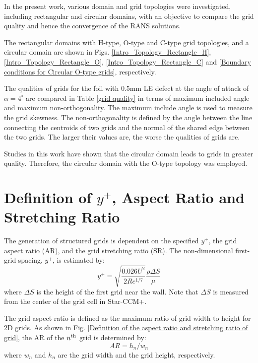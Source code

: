 \documentclass[onecolumn,11pt]{report}
\begin{document}
In the present work, various domain and grid topologies were investigated, including rectangular and circular domains, with an objective to compare the grid quality and hence the convergence of the RANS solutions. 

The rectangular domains with H-type, O-type and C-type grid topologies, and a circular domain are shown in Figs.  \ref{Intro_Topology_Rectangle_H}, \ref{Intro_Topology_Rectangle_O}, \ref{Intro_Topology_Rectangle_C} and \ref{Boundary conditions for Circular O-type grids}, respectively.



The qualities of grids for the foil with 0.5mm LE defect at the angle of attack of $\alpha=4^\circ$ are compared in Table  \ref{grid quality} in terms of maximum included angle and maximum non-orthogonality. The maximum include angle is used to measure the grid skewness. The non-orthogonality is defined by the angle between the line connecting the centroids of two grids and the normal of the shared edge between the two grids. The larger their values are, the worse the qualities of grids are.

Studies in this work have shown that the circular domain leads to grids in greater quality. Therefore, the circular domain with the O-type topology was employed. 


\section{Definition of $y^+$, Aspect Ratio and Stretching Ratio}

The generation of structured grids is dependent on the specified $y^+$, the grid aspect ratio (AR), and the grid stretching ratio (SR). The non-dimensional  first-grid spacing, $y^+$, is estimated by:
\begin{equation}
y^+ = \sqrt{\frac{0.026 U^2}{2Re^{1/7}}} \frac{\rho \Delta S}{ \mu}
\label{eq24}
\end{equation}
where $\Delta S$ is the height of the first grid near the wall. Note that  $\Delta S$ is measured from the center of the grid cell in Star-CCM+.

The grid aspect ratio is defined as the maximum ratio of grid width to height for 2D grids. As shown in Fig.  \ref{Definition of the aspect ratio and stretching ratio of grid}, the AR of the $n^{\rm th}$ grid is determined by:
\begin{equation}
AR = h_n/w_n
\label{eq25}
\end{equation}
where $w_n$ and $h_n$ are the grid width and the grid height, respectively.
\end{document}
